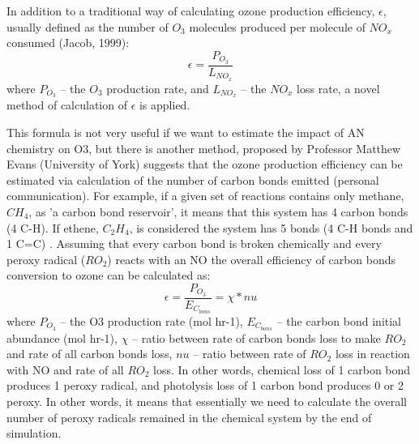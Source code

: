 \documentclass[11pt,a4paper]{article}
\begin{document}
In addition to a traditional way of calculating ozone production efficiency, $\epsilon$, usually defined as the 
number of $O_3$ molecules produced per molecule of $NO_x$ consumed (Jacob, 1999): 
\begin{equation}
\epsilon = \dfrac{P_{O_3}}{L_{NO_x}}
\end{equation}
where $P_{O_3}$ – the $O_3$ production rate, and $L_{NO_x}$ – the $NO_x$ loss rate, a novel method of calculation of $\epsilon$ is applied.

This formula is not very useful if we want to estimate the impact of AN chemistry on O3, but there is another method, proposed by Professor Matthew Evans (University of York) suggests that the ozone production efficiency can be estimated via calculation of the number of carbon bonds emitted \citep{Evans2014} (personal communication). For example, if a given set of reactions contains only methane, $CH_4$, as 'a carbon bond reservoir', it means that this system has 4 carbon bonds (4 C-H). If  ethene, $C_2H_4$, is considered the system has 5 bonds (4 C-H bonds and 1 C=C) \citep{Edwards2013}. Assuming that every carbon bond is broken chemically and every peroxy radical ($RO_2$) reacts with an NO the overall efficiency of carbon bonds conversion to ozone can be calculated as: 
\begin{equation}
\epsilon = \dfrac{P_{O_3}}{E_{C_{bons}}} = \chi*nu
\end{equation}
where $P_{O_3}$ – the O3 production rate (mol hr-1), $E_{C_{bons}}$  – the carbon bond initial abundance (mol hr-1), $\chi$ – ratio between rate of carbon bonds loss to make $RO_2$ and rate of all carbon bonds loss, $nu$ – ratio between rate of $RO_2$ loss in reaction with NO and rate of all $RO_2$ loss. In other words, chemical loss of 1 carbon bond produces 1 peroxy radical, and photolysis loss of 1 carbon bond produces 0 or 2 peroxy. In other words,  it means that essentially we need to calculate the overall number of peroxy radicals remained in the chemical system by the end of simulation.
\end{document}
